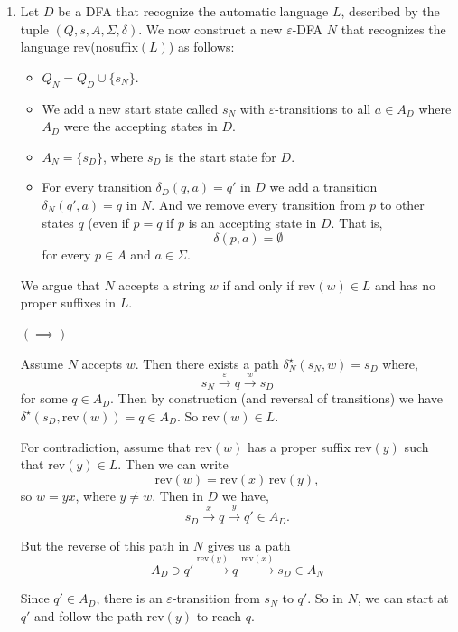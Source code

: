 \documentclass[12pt]{article}
\begin{document}
\begin{solution}
    \bbni
    \begin{enumerate}
        \item Let $D$ be a DFA that recognize the automatic language $L$, described by the tuple $(Q,s,A,\Sigma, \delta)$. We now construct a new $\varepsilon$-DFA $N$ that recognizes the language rev(nosuffix$(L)$) as follows: 
        \begin{itemize}
            \item $Q_N = Q_D \cup \{s_N\}$.        
            \item We add a new start state called $s_N$ with $\varepsilon$-transitions to all $a \in A_D$ where $A_D$ were the accepting states in $D$. 
            \item $A_N = \{s_D\}$, where $s_D$ is the start state for $D$.  
            \item For every transition $\delta_D(q, a) = q'$ in $D$ we add a transition $\delta_N (q', a) = q$ in $N$. And we remove every transition from $p$ to other states $q$ (even if $p = q$ if $p$ is an accepting state in $D$. That is, 
            \[\delta(p, a) = \emptyset\] 
            for every $p \in A$ and $a \in \Sigma$. 
        \end{itemize}


        We argue that $N$ accepts a string $w$ if and only if rev$(w) \in L$ and has no proper suffixes in $L$. 
        
        $(\implies)$
        
        Assume $N$ accepts $w$. Then there exists a path $\delta^\star_N(s_N, w) = s_D$ where, 
        \[s_N \xrightarrow{\varepsilon} q \xrightarrow{w} s_D\]
         for some $q \in A_D$. Then by construction (and reversal of transitions) we have $\delta^\star(s_D, \text{rev}(w)) = q \in A_D$. So rev$(w) \in L$. 
        

        For contradiction, assume that $\mathrm{rev}(w)$ has a proper suffix $\mathrm{rev}(y)$ such that $\mathrm{rev}(y) \in L$. Then we can write
        \[
        \mathrm{rev}(w) = \mathrm{rev}(x)\,\mathrm{rev}(y),
        \]
        so $w = yx$, where $y \neq w$. Then in $D$ we have, 
        \[
        s_D \xrightarrow{x} q \xrightarrow{y} q' \in A_D.
        \]

        But the reverse of this path in $N$ gives us a path
        \[
        A_D \ni q' \xrightarrow{\mathrm{rev}(y)} q \xrightarrow{\mathrm{rev}(x)} s_D \in A_N
        \]

        Since $q' \in A_D$, there is an $\varepsilon$-transition from $s_N$ to $q'$. So in $N$, we can start at $q'$ and follow the path $\mathrm{rev}(y)$ to reach $q$.


\end{enumerate}
\end{solution}
\end{document}
